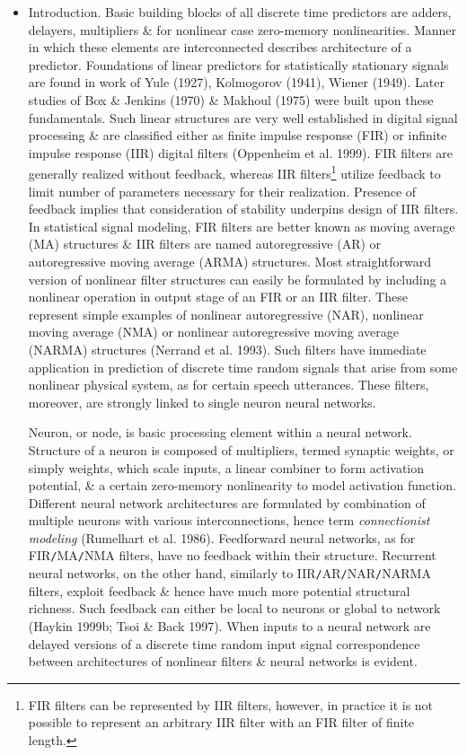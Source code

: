 \documentclass{article}
\begin{document}
\begin{enumerate}
\begin{itemize}
\begin{itemize}
			\item {\sf Introduction.} Basic building blocks of all discrete time predictors are adders, delayers, multipliers \& for nonlinear case zero-memory nonlinearities. Manner in which these elements are interconnected describes architecture of a predictor. Foundations of linear predictors for statistically stationary signals are found in work of Yule (1927), Kolmogorov (1941), Wiener (1949). Later studies of Box \& Jenkins (1970) \& Makhoul (1975) were built upon these fundamentals. Such linear structures are very well established in digital signal processing \& are classified either as finite impulse response (FIR) or infinite impulse response (IIR) digital filters (Oppenheim et al. 1999). FIR filters are generally realized without feedback, whereas IIR filters\footnote{FIR filters can be represented by IIR filters, however, in practice it is not possible to represent an arbitrary IIR filter with an FIR filter of finite length.} utilize feedback to limit number of parameters necessary for their realization. Presence of feedback implies that consideration of stability underpins design of IIR filters. In statistical signal modeling, FIR filters are better known as moving average (MA) structures \& IIR filters are named autoregressive (AR) or autoregressive moving average (ARMA) structures. Most straightforward version of nonlinear filter structures can easily be formulated by including a nonlinear operation in output stage of an FIR or an IIR filter. These represent simple examples of nonlinear autoregressive (NAR), nonlinear moving average (NMA) or nonlinear autoregressive moving average (NARMA) structures (Nerrand et al. 1993). Such ﬁlters have immediate application in prediction of discrete time random signals that arise from some nonlinear physical system, as for certain speech utterances. These filters, moreover, are strongly linked to single neuron neural networks.
			
			Neuron, or node, is basic processing element within a neural network. Structure of a neuron is composed of multipliers, termed synaptic weights, or simply weights, which scale inputs, a linear combiner to form activation potential, \& a certain zero-memory nonlinearity to model activation function. Different neural network architectures are formulated by combination of multiple neurons with various interconnections, hence term {\it connectionist modeling} (Rumelhart et al. 1986). Feedforward neural networks, as for FIR{\tt/}MA{\tt/}NMA filters, have no feedback within their structure. Recurrent neural networks, on the other hand, similarly to IIR{\tt/}AR{\tt/}NAR{\tt/}NARMA filters, exploit feedback \& hence have much more potential structural richness. Such feedback can either be local to neurons or global to network (Haykin 1999b; Tsoi \& Back 1997). When inputs to a neural network are delayed versions of a discrete time random input signal correspondence between architectures of nonlinear filters \& neural networks is evident.
			

\end{itemize}
\end{itemize}
\end{enumerate}
\end{document}
